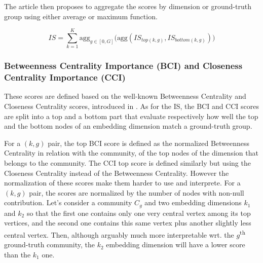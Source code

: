 The article then proposes to aggregate the scores by dimension or ground-truth group using either average or maximum function. %

\begin{equation}
    IS = \sum_{k=1}^K \text{agg}_{g \in [0, G]}\big(\text{agg}(IS_{top(k,g)}, IS_{bottom(k,g)})\big)
\end{equation}

\subsubsection{Betweenness Centrality Importance (BCI) and Closeness Centrality Importance (CCI)}\label{subsec:bci_cci_introduction}
These scores are defined based on the well-known Betweenness Centrality and Closeness Centrality scores, introduced in \cite{bloch2023centrality}.  As for the IS, the BCI and CCI scores are split into a top and a bottom part that evaluate respectively how well the top and the bottom nodes of an embedding dimension match a ground-truth group.

For a $(k, g)$ pair, the top BCI score is defined as the normalized Betweenness Centrality in relation with the community, of the top nodes of the dimension that belongs to the community. The CCI top score is defined similarly but using the Closeness Centrality instead of the Betweenness Centrality.
However the normalization of these scores make them harder to use and interprete. For a $(k, g)$ pair, the scores are normalized by the number of nodes with non-null contribution. Let's consider a community $C_g$ and two embedding dimensions $k_1$ and $k_2$ so that the first one contains only one very central vertex among its top vertices, and the second one contains this same vertex plus another slightly less central vertex. Then, although arguably much more interpretable wrt. the $g$\textsuperscript{th} ground-truth community, the $k_2$ embedding dimension will have a lower score than the $k_1$ one.

